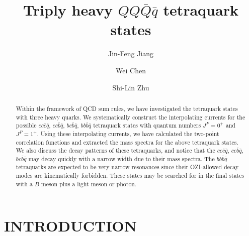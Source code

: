 \documentclass[prd,showpacs,showkeys,floatfix,amsmath,amssymb,floatfix,english]{revtex4}
\begin{document}
\title{Triply heavy $QQ\bar Q\bar q$ tetraquark states}

\author{Jin-Feng Jiang}

\author{Wei Chen}
 

\author{Shi-Lin Zhu}
 



\begin{abstract}
Within the framework of QCD sum rules, we have investigated the
tetraquark states with three heavy quarks. We systematically
construct the interpolating currents for the possible
$cc\bar{c}\bar{q}$, $cc\bar{b}\bar{q}$, $bc\bar{b}\bar{q}$,
$bb\bar{b}\bar{q}$ tetraquark states with quantum numbers
$J^{P}=0^{+}$ and $J^{P}=1^{+}$. Using these interpolating currents,
we have calculated the two-point correlation functions and extracted
the mass spectra for the above tetraquark states. We also discuss
the decay patterns of these tetraquarks, and notice that the
$cc\bar{c}\bar{q}$, $cc\bar{b}\bar{q}$, $bc\bar{b}\bar{q}$ may decay
quickly with a narrow width due to their mass spectra. The
$bb\bar{b}\bar{q}$ tetraquarks are expected to be very narrow
resonances since their OZI-allowed decay modes are kinematically
forbidden. These states may be searched for in the final states with
a $B$ meson plus a light meson or photon.
\end{abstract}

  \maketitle

\section{INTRODUCTION}
\label{sec2}
\end{document}
